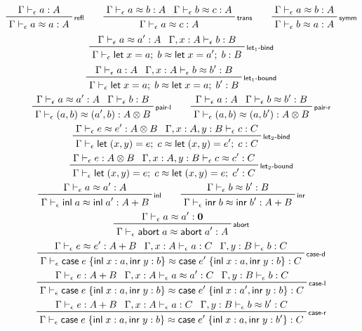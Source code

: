 \documentclass[acmsmall,screen,review]{acmart}
\newcommand{\mb}[1]{\ensuremath{\mathbf{#1}}}
\newcommand{\ms}[1]{\ensuremath{\mathsf{#1}}}
\newcommand{\lto}{:}
\newcommand{\linl}[1]{\ms{inl}\;{#1}}
\newcommand{\linr}[1]{\ms{inr}\;{#1}}
\newcommand{\labort}[1]{\ms{abort}\;{#1}}
\newcommand{\letexpr}[3]{\ensuremath{\ms{let}\;#1 = #2;\;#3}}
\newcommand{\caseexpr}[5]{\ms{case}\;#1\;\{\linl{#2} \lto #3, \linr{#4} \lto #5\}}
\newcommand{\bhyp}[2]{#1 : #2}
\newcommand{\rle}[1]{{\scriptsize\textsf{#1}}}
\newcommand{\hasty}[4]{#1 \vdash_{#2} #3: {#4}}
\newcommand{\teqv}{\approx}
\newcommand{\tmeq}[5]{#1 \vdash_{#2} #3 \teqv #4 : {#5}}
\begin{document}
\begin{gather*}
  \prftree[r]{\rle{refl}}{\hasty{\Gamma}{\epsilon}{a}{A}}{\tmeq{\Gamma}{\epsilon}{a}{a}{A}} \qquad
  \prftree[r]{\rle{trans}}
    {\tmeq{\Gamma}{\epsilon}{a}{b}{A}}
    {\tmeq{\Gamma}{\epsilon}{b}{c}{A}} 
    {\tmeq{\Gamma}{\epsilon}{a}{c}{A}} \qquad
  \prftree[r]{\rle{symm}}
    {\tmeq{\Gamma}{\epsilon}{a}{b}{A}}
    {\tmeq{\Gamma}{\epsilon}{b}{a}{A}}
  \\
  \prftree[r]{\rle{let$_1$-bind}}
    {\tmeq{\Gamma}{\epsilon}{a}{a'}{A}}
    {\hasty{\Gamma, \bhyp{x}{A}}{\epsilon}{b}{B}}
    {\tmeq{\Gamma}{\epsilon}{\letexpr{x}{a}{b}}{\letexpr{x}{a'}{b}}{B}} 
  \\
  \prftree[r]{\rle{let$_1$-bound}}
    {\hasty{\Gamma}{\epsilon}{a}{A}}
    {\tmeq{\Gamma, \bhyp{x}{A}}{\epsilon}{b}{b'}{B}}
    {\tmeq{\Gamma}{\epsilon}{\letexpr{x}{a}{b}}{\letexpr{x}{a}{b'}}{B}}
  \\
  \prftree[r]{\rle{pair-l}}
    {\tmeq{\Gamma}{\epsilon}{a}{a'}{A}}
    {\hasty{\Gamma}{\epsilon}{b}{B}}
    {\tmeq{\Gamma}{\epsilon}{(a, b)}{(a', b)}{A \otimes B}} \qquad
  \prftree[r]{\rle{pair-r}}
    {\hasty{\Gamma}{\epsilon}{a}{A}}
    {\tmeq{\Gamma}{\epsilon}{b}{b'}{B}}
    {\tmeq{\Gamma}{\epsilon}{(a, b)}{(a, b')}{A \otimes B}}
  \\
  \prftree[r]{\rle{let$_2$-bind}}
    {\tmeq{\Gamma}{\epsilon}{e}{e'}{A \otimes B}}
    {\hasty{\Gamma, \bhyp{x}{A}, \bhyp{y}{B}}{\epsilon}{c}{C}}
    {\tmeq{\Gamma}{\epsilon}{\letexpr{(x, y)}{e}{c}}{\letexpr{(x, y)}{e'}{c}}{C}}
  \\
  \prftree[r]{\rle{let$_2$-bound}}
    {\hasty{\Gamma}{\epsilon}{e}{A \otimes B}}
    {\tmeq{\Gamma, \bhyp{x}{A}, \bhyp{y}{B}}{\epsilon}{c}{c'}{C}}
    {\tmeq{\Gamma}{\epsilon}{\letexpr{(x, y)}{e}{c}}{\letexpr{(x, y)}{e}{c'}}{C}}
  \\
  \prftree[r]{\rle{inl}}
    {\tmeq{\Gamma}{\epsilon}{a}{a'}{A}}
    {\tmeq{\Gamma}{\epsilon}{\linl{a}}{\linl{a'}}{A + B}} \qquad
  \prftree[r]{\rle{inr}}
    {\tmeq{\Gamma}{\epsilon}{b}{b'}{B}}
    {\tmeq{\Gamma}{\epsilon}{\linr{b}}{\linr{b'}}{A + B}} \qquad
  \\
  \prftree[r]{\rle{abort}}
    {\tmeq{\Gamma}{\epsilon}{a}{a'}{\mb{0}}}
    {\tmeq{\Gamma}{\epsilon}{\labort{a}}{\labort{a'}}{A}}
  \\
  \prftree[r]{\rle{case-d}}
    {\tmeq{\Gamma}{\epsilon}{e}{e'}{A + B}}
    {\hasty{\Gamma, \bhyp{x}{A}}{\epsilon}{a}{C}}
    {\hasty{\Gamma, \bhyp{y}{B}}{\epsilon}{b}{C}}
    {\tmeq{\Gamma}{\epsilon}{\caseexpr{e}{x}{a}{y}{b}}{\caseexpr{e'}{x}{a}{y}{b}}{C}}
  \\
  \prftree[r]{\rle{case-l}}
    {\hasty{\Gamma}{\epsilon}{e}{A + B}}
    {\tmeq{\Gamma, \bhyp{x}{A}}{\epsilon}{a}{a'}{C}}
    {\hasty{\Gamma, \bhyp{y}{B}}{\epsilon}{b}{C}}
    {\tmeq{\Gamma}{\epsilon}{\caseexpr{e}{x}{a}{y}{b}}{\caseexpr{e'}{x}{a'}{y}{b}}{C}}
  \\
  \prftree[r]{\rle{case-r}}
    {\hasty{\Gamma}{\epsilon}{e}{A + B}}
    {\hasty{\Gamma, \bhyp{x}{A}}{\epsilon}{a}{C}}
    {\tmeq{\Gamma, \bhyp{y}{B}}{\epsilon}{b}{b'}{C}}
    {\tmeq{\Gamma}{\epsilon}{\caseexpr{e}{x}{a}{y}{b}}{\caseexpr{e'}{x}{a}{y}{b'}}{C}}
\end{gather*}
\end{document}
